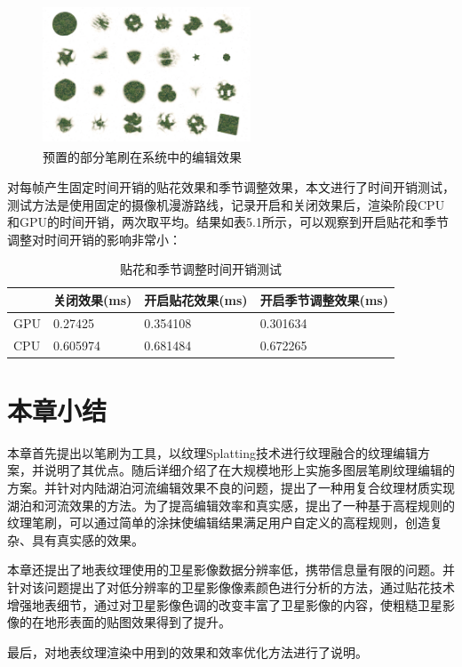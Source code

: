 \begin{figure}[H]
    \centering
    \includegraphics[height=4.2cm,width=6.2cm]{figures/brushEffect.jpg}
    \caption{预置的部分笔刷在系统中的编辑效果}
\end{figure}

对每帧产生固定时间开销的贴花效果和季节调整效果，本文进行了时间开销测试，测试方法是使用固定的摄像机漫游路线，记录开启和关闭效果后，渲染阶段CPU和GPU的时间开销，两次取平均。结果如表5.1所示，可以观察到开启贴花和季节调整对时间开销的影响非常小：
\begin{table}[h]
\caption{贴花和季节调整时间开销测试}
\begin{tabularx}{15cm}{llll}
\hline
&关闭效果(ms)&开启贴花效果(ms)&开启季节调整效果(ms)\\
\hline
GPU& 0.27425&0.354108&0.301634 \\
\hline
CPU&0.605974&0.681484&0.672265    \\
\end{tabularx}
\end{table}

\section{本章小结}
本章首先提出以笔刷为工具，以纹理Splatting技术进行纹理融合的纹理编辑方案，并说明了其优点。随后详细介绍了在大规模地形上实施多图层笔刷纹理编辑的方案。并针对内陆湖泊河流编辑效果不良的问题，提出了一种用复合纹理材质实现湖泊和河流效果的方法。为了提高编辑效率和真实感，提出了一种基于高程规则的纹理笔刷，可以通过简单的涂抹使编辑结果满足用户自定义的高程规则，创造复杂、具有真实感的效果。 \par
本章还提出了地表纹理使用的卫星影像数据分辨率低，携带信息量有限的问题。并针对该问题提出了对低分辨率的卫星影像像素颜色进行分析的方法，通过贴花技术增强地表细节，通过对卫星影像色调的改变丰富了卫星影像的内容，使粗糙卫星影像的在地形表面的贴图效果得到了提升。\par
最后，对地表纹理渲染中用到的效果和效率优化方法进行了说明。